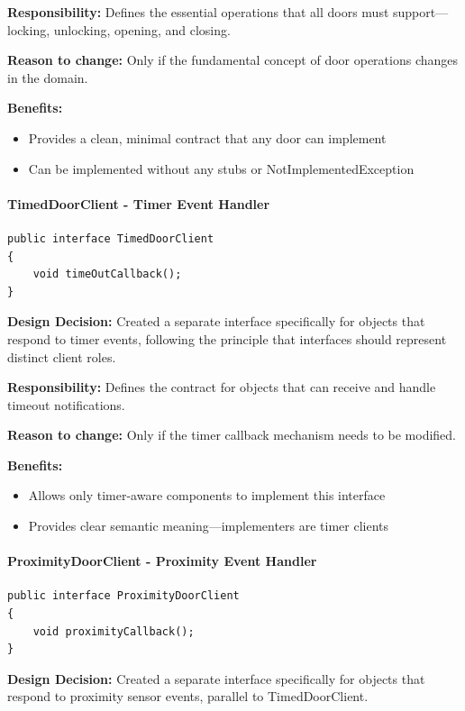 \textbf{Responsibility:} Defines the essential operations that all doors must support—locking, unlocking, opening, and closing.

\textbf{Reason to change:} Only if the fundamental concept of door operations changes in the domain.

\textbf{Benefits:}
\begin{itemize}
    \item Provides a clean, minimal contract that any door can implement
    \item Can be implemented without any stubs or NotImplementedException
\end{itemize}

\paragraph{TimedDoorClient - Timer Event Handler}

\begin{verbatim}
public interface TimedDoorClient
{
    void timeOutCallback();
}
\end{verbatim}

\textbf{Design Decision:} Created a separate interface specifically for objects that respond to timer events, following the principle that interfaces should represent distinct client roles.

\textbf{Responsibility:} Defines the contract for objects that can receive and handle timeout notifications.

\textbf{Reason to change:} Only if the timer callback mechanism needs to be modified.

\textbf{Benefits:}
\begin{itemize}
    \item Allows only timer-aware components to implement this interface
    \item Provides clear semantic meaning—implementers are timer clients
\end{itemize}

\paragraph{ProximityDoorClient - Proximity Event Handler}

\begin{verbatim}
public interface ProximityDoorClient
{
    void proximityCallback();
}
\end{verbatim}

\textbf{Design Decision:} Created a separate interface specifically for objects that respond to proximity sensor events, parallel to TimedDoorClient.

